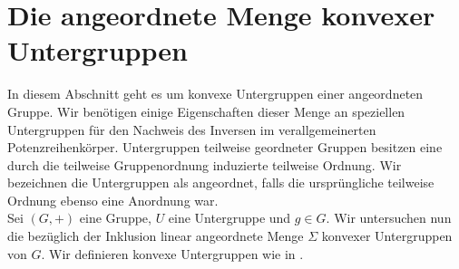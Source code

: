 \section{Die angeordnete Menge konvexer Untergruppen}
In diesem Abschnitt geht es um konvexe Untergruppen einer angeordneten Gruppe. Wir benötigen einige Eigenschaften dieser Menge an speziellen Untergruppen für den Nachweis des Inversen im verallgemeinerten Potenzreihenkörper. Untergruppen teilweise geordneter Gruppen besitzen eine durch die teilweise Gruppenordnung induzierte teilweise Ordnung. Wir bezeichnen die Untergruppen als angeordnet, falls die ursprüngliche teilweise Ordnung ebenso eine Anordnung war.\\
Sei $\left(G, +\right)$ eine Gruppe, $U$ eine Untergruppe und $g \in G$. 
Wir untersuchen nun die bezüglich der Inklusion linear angeordnete Menge $\Sigma$ konvexer Untergruppen von $G$. Wir definieren konvexe Untergruppen wie in \cite[S. 3]{priesscrampe83}.


